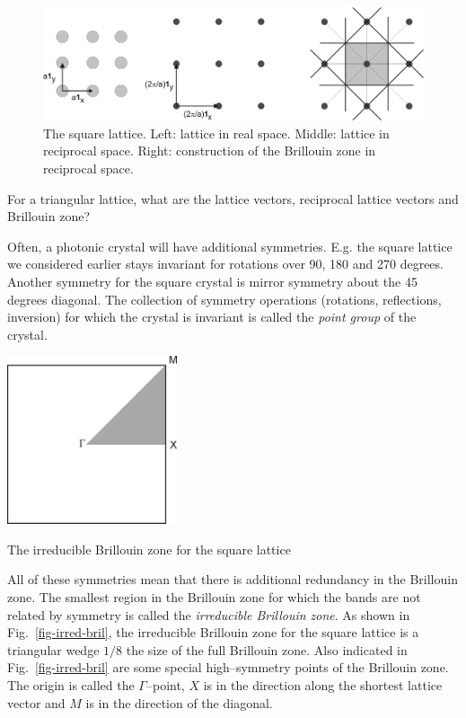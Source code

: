 \begin{figure}
\centering
\includegraphics{symmetry/figures/brillouin_square}
\caption{The square lattice. Left: lattice in real space. Middle: lattice in reciprocal space. Right: construction of the Brillouin zone in reciprocal space.}
\label{fig-bril-square}
\end{figure}


\begin{exer}
For a triangular lattice, what are the lattice vectors, reciprocal lattice vectors and Brillouin zone?
\end{exer}

\pagebreak
 

Often, a photonic crystal will have additional symmetries. E.g. the square lattice we considered earlier stays invariant for rotations over 90, 180 and 270 degrees. Another symmetry for the square crystal is mirror symmetry about the 45 degrees diagonal. The collection of symmetry operations (rotations, reflections, inversion) for which the crystal is invariant is called the \emph{point group} of the crystal.

\begin{marginfigure}
\centering
\includegraphics[width=5cm]{symmetry/figures/irred_bril}
\caption{The irreducible Brillouin zone for the square lattice}
\label{fig-irred-bril}
\end{marginfigure}

All of these symmetries mean that there is additional redundancy in the Brillouin zone. The smallest region in the Brillouin zone for which the bands are not related by symmetry is called the \emph{irreducible Brillouin zone}. As shown in Fig.~\ref{fig-irred-bril}, the irreducible Brillouin zone for the square lattice is a triangular wedge $1/8$ the size of the full Brillouin zone. Also indicated in Fig.~\ref{fig-irred-bril} are some special high--symmetry points of the Brillouin zone. The origin is called the $\Gamma$--point, $X$ is in the direction along the shortest lattice vector and $M$ is in the direction of the diagonal. 


